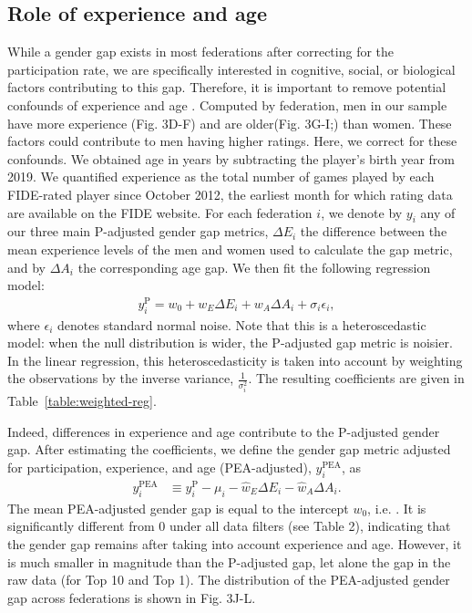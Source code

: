 \documentclass[9pt,twocolumn,twoside,lineno]{pnas-new}
\begin{document}
\subsection*{Role of experience and age}
While a gender gap exists in most federations after correcting for the participation rate, we are specifically interested in cognitive, social, or biological factors contributing to this gap. Therefore, it is important to remove potential confounds of experience \cite{ de2022micro} and age \cite{smerdon2020female}. Computed by federation, men in our sample have more experience (Fig. 3D-F) and are older(Fig. 3G-I;) than women. These factors could contribute to men having higher ratings. Here, we correct for these confounds. We obtained age in years  by subtracting the player's birth year from 2019. We quantified experience as the total number of games played by each FIDE-rated player since October 2012, the earliest month for which rating data are available on the FIDE website. For each federation $i$, we denote by $y_i$ any of our three main P-adjusted gender gap metrics, $\Delta E_i$ the difference between the mean experience levels of the men and women used to calculate the gap metric, and by $\Delta A_i$ the corresponding age gap. We then fit the following regression model:
\begin{align}
    y^\text{P}_i = w_0 + w_E \Delta E_i + w_A \Delta A_i + \sigma_i \epsilon_i,
\end{align}
where $\epsilon_i$ denotes standard normal noise. Note that this is a heteroscedastic model: when the null distribution is wider, the P-adjusted gap metric is  noisier.  In the linear regression, this heteroscedasticity is taken into account by weighting the observations by the inverse variance, $\frac{1}{\sigma_i^2}$. The resulting coefficients are given in Table~\ref{table:weighted-reg}.


Indeed, differences in experience and age contribute to the P-adjusted gender gap. After estimating the coefficients, we define the gender gap metric adjusted for participation, experience, and age (PEA-adjusted), $y^\text{PEA}_i$, as
\begin{align}
 y^\text{PEA}_i & \equiv  y^\text{P}_i - \mu_i - \hat{w}_E \Delta E_i - \hat{w}_A \Delta A_i.
\end{align}
The mean PEA-adjusted gender gap is equal to the intercept $w_0$, i.e. . It is significantly different from 0 under all data filters (see Table 2), indicating that the gender gap remains after taking into account experience and age. However, it is much smaller in magnitude than the P-adjusted gap, let alone the gap in the raw data (for Top 10 and Top 1).  The distribution of the PEA-adjusted gender gap across federations is shown in Fig. 3J-L.
\end{document}
